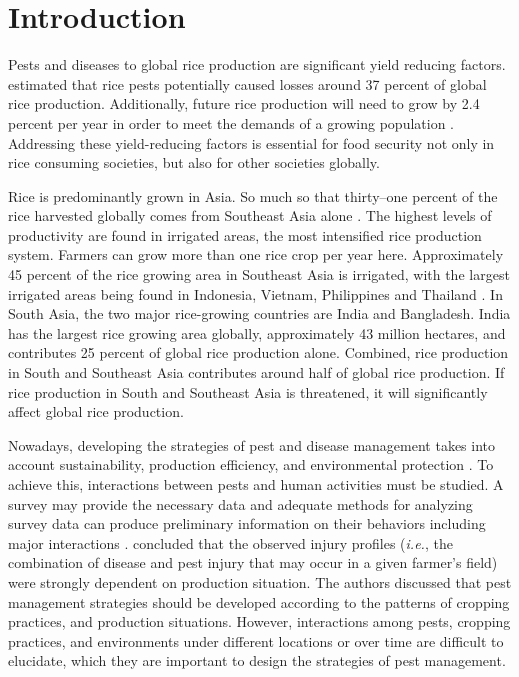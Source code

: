 \section{Introduction}

Pests and diseases to global rice production are significant yield reducing factors. \citet{OERKE_2006} estimated that rice pests potentially caused losses around 37 percent of global rice production. Additionally, future rice production will need to grow by 2.4 percent per year in order to meet the demands of a growing population \citep{Ray:2013by}. Addressing these yield-reducing factors is essential for food security not only in rice consuming societies, but also for other societies globally.

Rice is predominantly grown in Asia. So much so that thirty--one percent of the rice harvested globally comes from Southeast Asia alone \citep{oecd2012oecd}. The highest levels of productivity are found in irrigated areas, the most intensified rice production system. Farmers can grow more than one rice crop per year here. Approximately 45 percent of the rice growing area in Southeast Asia is irrigated, with the largest irrigated areas being found in Indonesia, Vietnam, Philippines and Thailand \citep{mutert2002developments}. In South Asia, the two major rice-growing countries are India and Bangladesh. India has the largest rice growing area globally, approximately 43 million hectares, and contributes 25 percent of global rice production alone. Combined, rice production in South and Southeast Asia contributes around half of global rice production. If rice production in South and Southeast Asia is threatened, it will significantly affect global rice production. 

Nowadays, developing the strategies of pest and disease management takes into account sustainability, production efficiency, and environmental protection \citep{Mew:2004kh}. To achieve this, interactions between pests and human activities must be studied. A survey may provide the necessary data and adequate methods for analyzing survey data can produce preliminary information on their behaviors including major interactions \citep{savary1995use}. \citet{Savary:2000vr} concluded that the observed injury profiles (\textit{i.e.}, the combination of disease and pest injury that may occur in a given farmer's field) were strongly dependent on production situation.  The authors discussed that pest management strategies should be developed according to the patterns of cropping practices, and production situations. However, interactions among pests, cropping practices, and environments under different locations or over time are difficult to elucidate, which they are important to design the strategies of pest management.

